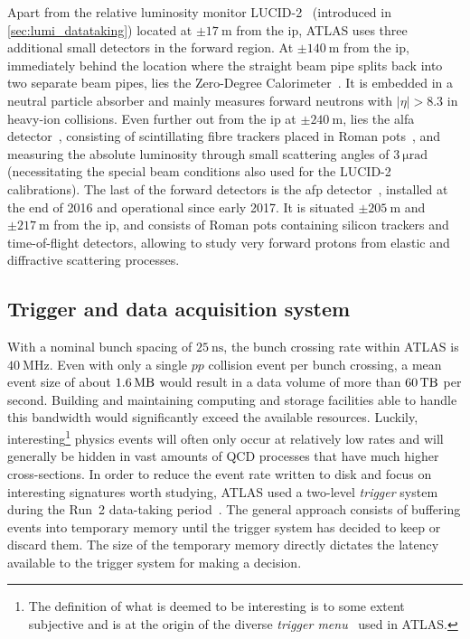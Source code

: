 Apart from the relative luminosity monitor LUCID-2~\cite{Avoni_2018} (introduced in \cref{sec:lumi_datataking}) located at $\pm \SI{17}{\meter}$ from the \gls{ip}, ATLAS uses three additional small detectors in the forward region. At $\pm \SI{140}{\meter}$ from the \gls{ip}, immediately behind the location where the straight beam pipe splits back into two separate beam pipes, lies the Zero-Degree Calorimeter~\cite{Leite:1628749}. It is embedded in a neutral particle absorber and mainly measures forward neutrons with $\vert\eta\vert > 8.3$ in heavy-ion collisions. Even further out from the \gls{ip} at $\pm \SI{240}{\meter}$, lies the \gls{alfa} detector~\cite{AbdelKhalek:2016tiv}, consisting of scintillating fibre trackers placed in Roman pots~\cite{AMALDI1977390}, and measuring the absolute luminosity through small scattering angles of $\SI{3}{\micro\radian}$ (necessitating the special beam conditions also used for the LUCID-2 calibrations). The last of the forward detectors is the \gls{afp} detector~\cite{Adamczyk:2017378}, installed at the end of 2016 and operational since early 2017. It is situated $\pm\SI{205}{\meter}$ and $\pm\SI{217}{\meter}$ from the \gls{ip}, and consists of Roman pots containing silicon trackers and time-of-flight detectors, allowing to study very forward protons from elastic and diffractive scattering processes.

\subsection{Trigger and data acquisition system}\label{sec:trigger}

With a nominal bunch spacing of $\SI{25}{\nano\second}$, the bunch crossing rate within ATLAS is $\SI{40}{\MHz}$. Even with only a single $pp$ collision event per bunch crossing, a mean event size of about $\SI{1.6}{\mega\byte}$ would result in a data volume of more than $\SI{60}{\tera\byte}$ per second. Building and maintaining computing and storage facilities able to handle this bandwidth would significantly exceed the available resources. Luckily, interesting\footnote{The definition of what is deemed to be interesting is to some extent subjective and is at the origin of the diverse \textit{trigger menu}~\cite{Martinez:2016udm} used in ATLAS.} physics events will often only occur at relatively low rates and will generally be hidden in vast amounts of QCD processes that have much higher cross-sections. In order to reduce the event rate written to disk and focus on interesting signatures worth studying, ATLAS used a two-level \textit{trigger} system during the Run~2 data-taking period~\cite{Martinez:2016udm}. The general approach consists of buffering events into temporary memory until the trigger system has decided to keep or discard them. The size of the temporary memory directly dictates the latency available to the trigger system for making a decision.

